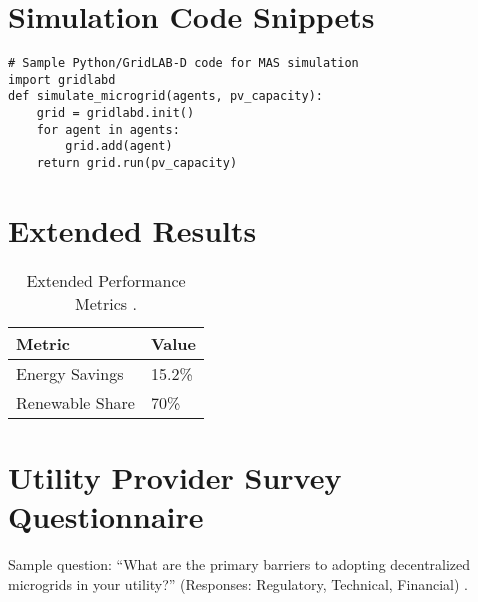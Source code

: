 \documentclass[12pt]{report}
\begin{document}
\appendix
\chapter{Simulation Code Snippets}
\begin{doublespace}
\begin{lstlisting}
# Sample Python/GridLAB-D code for MAS simulation
import gridlabd
def simulate_microgrid(agents, pv_capacity):
    grid = gridlabd.init()
    for agent in agents:
        grid.add(agent)
    return grid.run(pv_capacity)
\end{lstlisting}
\end{doublespace}

\chapter{Extended Results}
\begin{doublespace}
\begin{table}[h]
    \centering
    \caption{Extended Performance Metrics \cite{MNRE2023}.}
    \label{tab:extended_results}
    \begin{tabular}{ll}
        \toprule
        \textbf{Metric} & \textbf{Value} \\
        \midrule
        Energy Savings & 15.2\% \\
        Renewable Share & 70\% \\
        \bottomrule
    \end{tabular}
\end{table}
\end{doublespace}

\chapter{Utility Provider Survey Questionnaire}
\begin{doublespace}
Sample question: “What are the primary barriers to adopting decentralized microgrids in your utility?” (Responses: Regulatory, Technical, Financial) \cite{MNRE2023}.
\end{doublespace}
\end{document}
